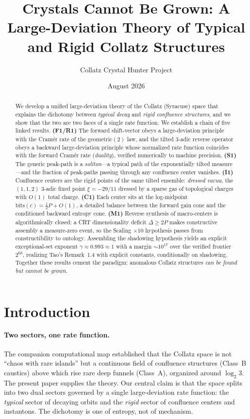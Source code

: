 \documentclass[12pt,a4paper]{article}
\title{Crystals Cannot Be Grown: A Large-Deviation Theory of Typical and Rigid Collatz Structures}
\author{Collatz Crystal Hunter Project}
\date{August 2026}
\begin{document}
\maketitle

\begin{abstract}
We develop a unified large-deviation theory of the Collatz (Syracuse) space that
explains the dichotomy between \emph{typical decay} and \emph{rigid confluence
structures}, and we show that the two are two faces of a single rate function.
We establish a chain of five linked results.
\textbf{(F1/R1)} The forward shift-vector obeys a large-deviation principle with
the Cram\'er rate of the geometric$(2)$ law, and the tilted $3$-adic reverse
operator obeys a backward large-deviation principle whose normalized rate
function coincides with the forward Cram\'er rate (\emph{duality}), verified
numerically to machine precision.
\textbf{(S1)} The generic peak-path is a \emph{soliton}---a typical path of the
exponentially tilted measure---and the fraction of peak-paths passing through
any confluence center vanishes.
\textbf{(I1)} Confluence centers are the rigid points of the same tilted
ensemble: \emph{dressed vacua}, the $(1,1,2)$ $3$-adic fixed point
$\xi=-29/11$ dressed by a sparse gas of topological charges with $O(1)$ total
charge.
\textbf{(C1)} Each center sits at the log-midpoint
$\mathrm{bits}(c)=\tfrac12 P+O(1)$, a detailed balance between the forward gain
cone and the conditioned backward entropy cone.
\textbf{(M1)} Reverse synthesis of macro-centers is algorithmically closed: a
CRT dimensionality deficit $\Delta\ge2P$ makes constructive assembly a
measure-zero event, so the Scaling $\times10$ hypothesis passes from
constructibility to ontology.
Assembling the shadowing hypothesis yields an explicit exceptional-set exponent
$\gamma\approx0.993\approx1$ with a margin $\sim10^{17}$ over the verified
frontier $2^{68}$, realizing Tao's Remark~1.4 with explicit constants,
conditionally on shadowing. Together these results cement the paradigm:
anomalous Collatz structures \emph{can be found but cannot be grown}.
\end{abstract}

\section{Introduction}
\paragraph{Two sectors, one rate function.}
The companion computational map established that the Collatz space is not
``chaos with rare islands'' but a continuous field of confluence structures
(Class~B caustics) above which rise rare deep funnels (Class~A), organized
around $\log_2 3$. The present paper supplies the theory. Our central claim is
that the space splits into two dual sectors governed by a single
large-deviation rate function: the \emph{typical} sector of decaying orbits and
the \emph{rigid} sector of confluence centers and instantons. The dichotomy is
one of entropy, not of mechanism.
\end{document}

